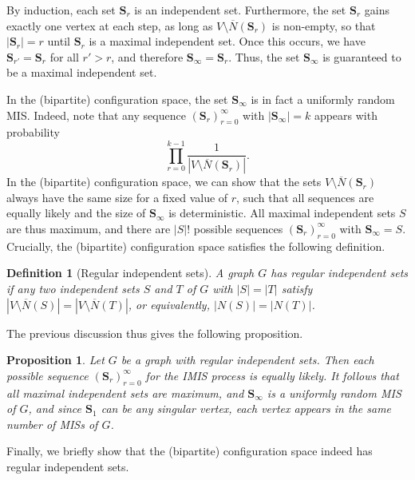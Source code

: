 \documentclass{article}
\theoremstyle{plain}
\theoremstyle{remark}
\theoremstyle{plain}
\newtheorem{proposition}[theorem]{Proposition}
\newtheorem{definition}[theorem]{Definition}
\numberwithin{equation}{section}
\begin{document}
	By induction, each set $\boldsymbol{S}_r$ is an independent set. Furthermore, the set $\boldsymbol{S}_r$ gains exactly one vertex at each step, as long as $V\setminus\overline{N}(\boldsymbol{S}_r)$ is non-empty, so that $|\boldsymbol{S}_r|=r$ until $\boldsymbol{S}_r$ is a maximal independent set. Once this occurs, we have $\boldsymbol{S}_{r'}=\boldsymbol{S}_r$ for all $r'>r$, and therefore $\boldsymbol{S}_{\infty}=\boldsymbol{S}_r$. Thus, the set $\boldsymbol{S}_{\infty}$ is guaranteed to be a maximal independent set.
	
	In the (bipartite) configuration space, the set $\boldsymbol{S}_{\infty}$ is in fact a uniformly random MIS. Indeed, note that any sequence $(\boldsymbol{S}_r)_{r=0}^{\infty}$ with $|\boldsymbol{S}_{\infty}|=k$ appears with probability $$\prod_{r=0}^{k-1}\frac{1}{|V\setminus \overline{N}(\boldsymbol{S}_r)|}.$$ In the (bipartite) configuration space, we can show that the sets $V\setminus\overline{N}(\boldsymbol{S}_r)$ always have the same size for a fixed value of $r$, such that all sequences are equally likely and the size of $\boldsymbol{S}_{\infty}$ is deterministic. All maximal independent sets $S$ are thus maximum, and there are $|S|!$ possible sequences $(\boldsymbol{S}_r)_{r=0}^{\infty}$ with $\boldsymbol{S}_{\infty}=S$. Crucially, the (bipartite) configuration space satisfies the following definition.
	
	\begin{definition}[Regular independent sets]
		A graph $G$ has \emph{regular independent sets} if any two independent sets $S$ and $T$ of $G$ with $|S|=|T|$ satisfy $|V\setminus\overline{N}(S)|=|V\setminus\overline{N}(T)|$, or equivalently, $|N(S)|=|N(T)|$.
	\end{definition}
	
	The previous discussion thus gives the following proposition.
	
	\begin{proposition}\label{proposition_imis}
		Let $G$ be a graph with regular independent sets. Then each possible sequence $(\boldsymbol{S}_r)_{r=0}^{\infty}$ for the IMIS process is equally likely. It follows that all maximal independent sets are maximum, and $\boldsymbol{S}_{\infty}$ is a uniformly random MIS of $G$, and since $\boldsymbol{S}_1$ can be any singular vertex, each vertex appears in the same number of MISs of $G$.
	\end{proposition}
	
	Finally, we briefly show that the (bipartite) configuration space indeed has regular independent sets.
	
\end{document}
